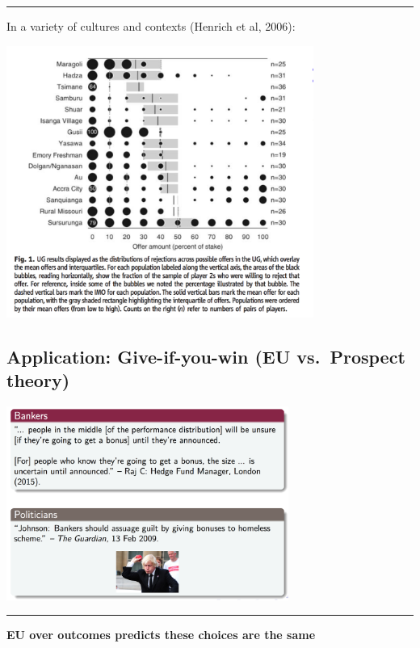 \documentclass[]{article}
\begin{document}
\begin{center}\rule{0.5\linewidth}{\linethickness}\end{center}

In a variety of cultures and contexts (Henrich et al, 2006):

\includegraphics[height=3.5in]{picsfigs/ultimatumgameoffers_Science.png}

\hypertarget{application-give-if-you-win-eu-vs.-prospect-theory}{%
\subsection{Application: Give-if-you-win (EU vs.~Prospect
theory)}\label{application-give-if-you-win-eu-vs.-prospect-theory}}

\includegraphics[height=2.5in]{picsfigs/borisbanks.png}

\begin{center}\rule{0.5\linewidth}{\linethickness}\end{center}

\textbf{EU over outcomes predicts these choices are the same}
\end{document}

